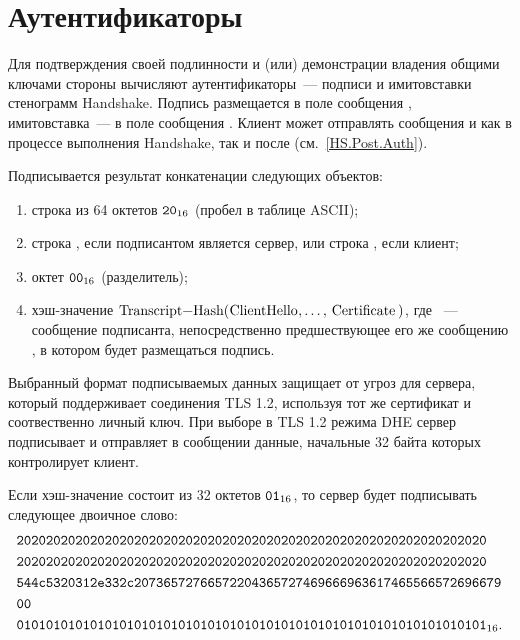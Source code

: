 \section{Аутентификаторы}\label{CRYPTO.Auth} 

Для подтверждения своей подлинности и (или) демонстрации владения общими ключами 
стороны вычисляют аутентификаторы~--- подписи и имитовставки стенограмм Handshake. 
%
Подпись размещается в поле  сообщения 
, имитовставка~--- в поле  
сообщения .
%
Клиент может отправлять сообщения  и 
 как в процессе выполнения Handshake, так и после 
(см.~\ref{HS.Post.Auth}).

Подписывается результат конкатенации следующих объектов: 
\begin{enumerate}[label=\arabic*)]
\item
строка из 64 октетов $\texttt{20}_{16}$ (пробел в таблице ASCII);
\item
строка , если подписантом 
является сервер, или строка , если 
клиент; 
%
%
\item
октет $\texttt{00}_{16}$ (разделитель);
\item
хэш-значение 
$\code{Transcript-Hash}(\code{ClientHello},\ldots,\code{Certificate})$, 
где ~--- сообщение подписанта, непосредственно предшествующее 
его же сообщению , в котором будет размещаться 
подпись.
\end{enumerate}

\begin{note*}
Выбранный формат подписываемых данных защищает от угроз для сервера, который
поддерживает соединения TLS 1.2, используя тот же сертификат и соотвественно
личный ключ. При выборе в TLS 1.2 режима DHE сервер подписывает и отправляет в
сообщении  данные, начальные 32 байта которых 
контролирует клиент.
\end{note*}


\begin{example*}
Если хэш-значение состоит из 32 октетов $\texttt{01}_{16}$, то сервер будет подписывать 
следующее двоичное слово:
\begin{align*}
&\texttt{2020202020202020202020202020202020202020202020202020202020202020}\\
&\texttt{2020202020202020202020202020202020202020202020202020202020202020}\\
&\texttt{544c5320312e332c20736572766572204365727469666963617465566572696679}\\
&\texttt{00}\\
&\texttt{0101010101010101010101010101010101010101010101010101010101010101}_{16}.
\end{align*}
\end{example*}

